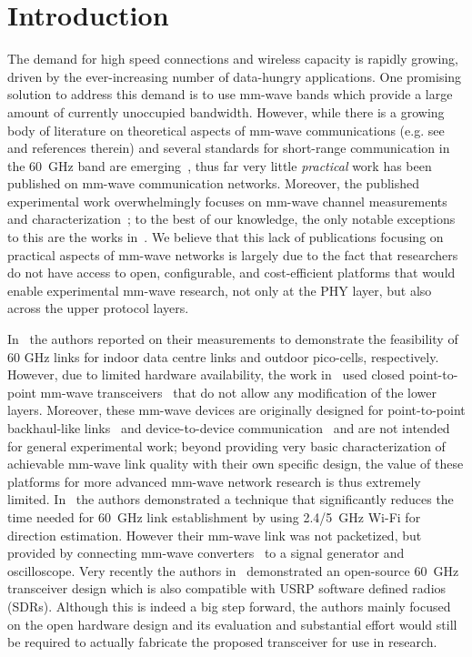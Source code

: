 \documentclass{sig-alternate}
\begin{document}

\section{Introduction}
The demand for high speed connections and wireless capacity is rapidly growing, driven by the ever-increasing number of data-hungry applications. One promising solution to address this demand is to use mm-wave bands which provide a large amount of currently unoccupied bandwidth. However, while there is a growing body of literature on theoretical aspects of mm-wave communications (e.g. see~\cite{Rappaport14} and references therein) and several standards for short-range communication in the 60~GHz band are emerging~\cite{IEEE80211ad, IEEE802153c}, thus far very little \emph{practical} work has been published on mm-wave communication networks. Moreover, the published experimental work overwhelmingly focuses on mm-wave channel measurements and characterization~\cite{Rappaport01, Weiler14}; to the best of our knowledge, the only notable exceptions to this are the works in~\cite{Zhou12, Zhu14, Nitsche15, Zetterberg15}. We believe that this lack of publications focusing on practical aspects of mm-wave networks is largely due to the fact that researchers do not have access to open, configurable, and cost-efficient platforms that would enable experimental mm-wave research, not only at the PHY layer, but also across the upper protocol layers.

In~\cite{Zhou12, Zhu14} the authors reported on their measurements to demonstrate the feasibility of 60 GHz links for indoor data centre links and outdoor pico-cells, respectively. However, due to limited hardware availability, the work in~\cite{Zhou12, Zhu14} used closed point-to-point mm-wave transceivers~\cite{hxi, wilocity} that do not allow any modification of the lower layers. Moreover, these mm-wave devices are originally designed for point-to-point backhaul-like links~\cite{hxi}  and device-to-device communication~\cite{wilocity} and are not intended for general experimental work; beyond providing very basic characterization of achievable mm-wave link quality with their own specific design, the value of these platforms for more advanced mm-wave network research is thus extremely limited. In~\cite{Nitsche15} the authors demonstrated a technique that significantly reduces the time needed for 60~GHz link establishment by using 2.4/5~GHz Wi-Fi for direction estimation. However their mm-wave link was not packetized, but provided by connecting mm-wave converters~\cite{vubiqnetworks} to a signal generator and oscilloscope. Very recently the authors in~\cite{Zetterberg15} demonstrated an open-source 60~GHz transceiver design which is also compatible with USRP software defined radios (SDRs). Although this is indeed a big step forward, the authors mainly focused on the open hardware design and its evaluation and substantial effort would still be required to actually fabricate the proposed transceiver for use in research.
\end{document}
